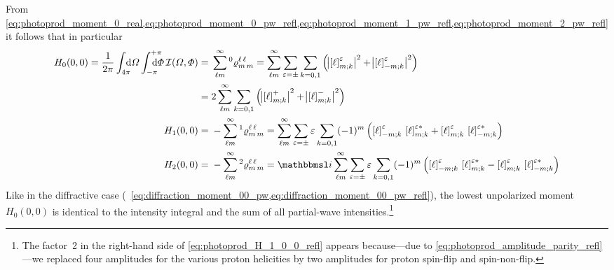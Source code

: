 From
\cref{eq:photoprod_moment_0_real,eq:photoprod_moment_0_pw_refl,eq:photoprod_moment_1_pw_refl,eq:photoprod_moment_2_pw_refl}
it follows that in particular
\begin{align}
  H_0(0, 0)
  = \frac{1}{2 \pi} \int_{4 \pi}\!\!\!\! \dif{\Omega} \int_{-\pi}^{+\pi}\hspace{-1.2em} \dif{\Phi}\,
  \intensity(\Omega, \Phi)
  ={}& \sum_{\ell m}^\infty \prescript{0}{}{\varrho}^{\ell\, \ell}_{m\, m}
  = \sum_{\ell m}^\infty \sum_{\refl = \pm} \sum_{k = 0, 1}
  \rBrk[2]{\Abs[1]{\sBrk{\ell}^\refl_{m; k}}^2 + \Abs[1]{\sBrk{\ell}^\refl_{{-m}; k}}^2} \nonumber
  \\
  \label{eq:photoprod_H_1_0_0_refl}
  ={}& 2 \sum_{\ell m}^\infty \sum_{k = 0, 1}
  \rBrk[2]{\Abs[1]{\sBrk{\ell}^+_{m; k}}^2 + \Abs[1]{\sBrk{\ell}^-_{m; k}}^2}
  \\
  H_1(0, 0)
  ={}& -\sum_{\ell m}^\infty \prescript{1}{}{\varrho}^{\ell\, \ell}_{m\, m}
  = \sum_{\ell m}^\infty \sum_{\refl = \pm} \refl \sum_{k = 0, 1}
  (-1)^m \rBrk[2]{\sBrk{\ell}^\refl_{{-m}; k}\, \sBrk{\ell}^{\refl *}_{m; k}
  + \sBrk{\ell}^\refl_{m; k}\, \sBrk{\ell}^{\refl *}_{{-m}; k}}
  \\
  H_2(0, 0)
  ={}& -\sum_{\ell m}^\infty \prescript{2}{}{\varrho}^{\ell\, \ell}_{m\, m}
  = \imag \sum_{\ell m}^\infty \sum_{\refl = \pm} \refl \sum_{k = 0, 1}
  (-1)^m \rBrk[2]{\sBrk{\ell}^\refl_{{-m}; k}\, \sBrk{\ell}^{\refl *}_{m; k}
  - \sBrk{\ell}^\refl_{m; k}\, \sBrk{\ell}^{\refl *}_{{-m}; k}}
\end{align}
Like in the diffractive case (\confer\
\cref{eq:diffraction_moment_00_pw,eq:diffraction_moment_00_pw_refl}),
the lowest unpolarized moment $H_0(0, 0)$ is identical to the
intensity integral and the sum of all partial-wave
intensities.\footnote{The factor~2 in the right-hand side of
\cref{eq:photoprod_H_1_0_0_refl} appears because---due to
\cref{eq:photoprod_amplitude_parity_refl}---we replaced four
amplitudes for the various proton helicities by two amplitudes for
proton spin-flip and spin-non-flip.}

